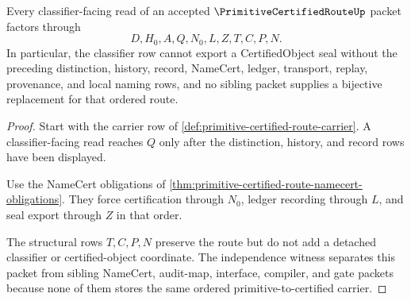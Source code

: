 \begin{theorem}
\label{thm:primitive-certified-route-classifier-nonescape}
Every classifier-facing read of an accepted $\PrimitiveCertifiedRouteUp$ packet factors through
$$
D,H_0,A,Q,N_0,L,Z,T,C,P,N .
$$
In particular, the classifier row cannot export a CertifiedObject seal without the preceding distinction, history, record, NameCert, ledger, transport, replay, provenance, and local naming rows, and no sibling packet supplies a bijective replacement for that ordered route.
\end{theorem}
\begin{proof}
Start with the carrier row of \autoref{def:primitive-certified-route-carrier}. A classifier-facing read reaches $Q$ only after the distinction, history, and record rows have been displayed.

Use the NameCert obligations of \autoref{thm:primitive-certified-route-namecert-obligations}. They force certification through $N_0$, ledger recording through $L$, and seal export through $Z$ in that order.

The structural rows $T,C,P,N$ preserve the route but do not add a detached classifier or certified-object coordinate. The independence witness separates this packet from sibling NameCert, audit-map, interface, compiler, and gate packets because none of them stores the same ordered primitive-to-certified carrier.
\end{proof}


\begin{closurestatus}{\PrimitiveCertifiedRouteUp}
  \theoryclosure{\seedClosure}
  \formalstatus{\unformalizedV}
\end{closurestatus}
